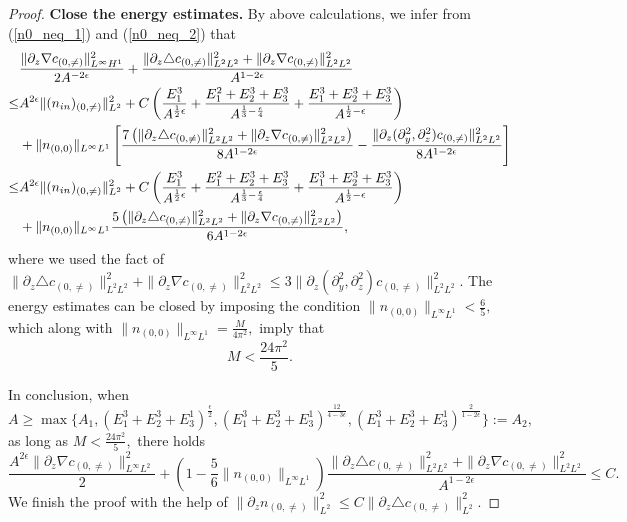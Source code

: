 \documentclass[12pt, reqno]{amsart}
\numberwithin{equation}{section}
\begin{document}
\begin{proof}
		
		{\bf  Close the energy estimates.}
		By above calculations, we infer from (\ref{n0_neq_1}) and (\ref{n0_neq_2}) that 
		\begin{equation}\label{n0_neq_3}
			\begin{aligned}
				&\frac{\|\partial_z\nabla c_{(0,\neq)}\|^2_{L^{\infty}H^1}}{2A^{-2\epsilon}}
				+\frac{\|\partial_z\triangle c_{(0,\neq)}\|^2_{L^2L^2}+
					\|\partial_z\nabla c_{(0,\neq)}\|^2_{L^{2}L^2}}{A^{1-2\epsilon}}
				\\
				\leq& A^{2\epsilon}\|(n_{\rm in})_{(0,\neq)}\|^2_{L^2}+C\left(\frac{E_1^3}{ A^{\frac{1}{2}\epsilon}}
				+\frac{E_1^2+E_2^3+E_3^3}{ A^{\frac13-\frac{\epsilon}{4}}}
				+\frac{E_1^3+E_2^3+E_3^3}{ A^{\frac12-\epsilon}}\right)\\&+\|n_{(0,0)}\|_{L^\infty L^1}
				\left[
				\frac{7\left(\|\partial_z\triangle c_{(0,\neq)}\|_{L^2L^2}^2
					+\|\partial_z\nabla c_{(0,\neq)}\|_{L^2L^2}^2\right)
				}{8A^{1-2\epsilon}}-\frac{\|\partial_{z}(\partial_{y}^{2},\partial_{z}^{2})c_{(0,\neq)}\|_{L^{2}L^{2}}^{2}}{8A^{1-2\epsilon}}\right]
				\\\leq&A^{2\epsilon}\|(n_{\rm in})_{(0,\neq)}\|^2_{L^2}+C\left(\frac{E_1^3}{ A^{\frac{1}{2}\epsilon}}
				+\frac{E_1^2+E_2^3+E_3^3}{ A^{\frac13-\frac{\epsilon}{4}}}
				+\frac{E_1^3+E_2^3+E_3^3}{ A^{\frac12-\epsilon}}\right)\\&+\|n_{(0,0)}\|_{L^{\infty}L^{1}}\frac{5\left(\|\partial_z\triangle c_{(0,\neq)}\|_{L^2L^2}^2
					+\|\partial_z\nabla c_{(0,\neq)}\|_{L^2L^2}^2\right)}{6A^{1-2\epsilon}},
			\end{aligned}
		\end{equation}
		where we used the fact of $ \|\partial_{z}\triangle c_{(0,\neq)}\|_{L^{2}L^{2}}^{2}+\|\partial_{z}\nabla c_{(0,\neq)}\|_{L^{2}L^{2}}^{2}\leq 3\|\partial_{z}(\partial_{y}^{2}, \partial_{z}^{2})c_{(0,\neq)}\|_{L^{2}L^{2}}^{2}. $
		The energy estimates can be closed by imposing the condition
		$\|n_{(0,0)}\|_{L^\infty L^1}<\frac65,$
		which along with $\|n_{(0,0)}\|_{L^{\infty}L^1}=\frac{M}{4\pi^2},$
		imply that 
		\begin{equation*}
			M<\frac{24\pi^2}{5}.
		\end{equation*}
		
		In conclusion,
		when $$A\geq\max\{A_1,(E_1^3+E_2^3+E_3^1)^{\frac{\epsilon}{2}},
		(E_1^3+E_2^3+E_3^1)^{\frac{12}{4-3\epsilon}},(E_1^3+E_2^3+E_3^1)^{\frac{2}{1-2\epsilon}}\}:=A_2,$$ as long as $M< \frac{24\pi^2}{5},$
		there holds 
		\begin{equation*}
			\frac{A^{2\epsilon}\|\partial_z\nabla c_{(0,\neq)}\|^2_{L^{\infty}L^2}}{2}+\left(1-\frac56\|n_{(0,0)}\|_{L^{\infty}L^{1}} \right)
			\frac{\|\partial_z\triangle c_{(0,\neq)}\|_{L^2L^2}^2
				+\|\partial_z\nabla c_{(0,\neq)}\|_{L^2L^2}^2}{A^{1-2\epsilon}}
			\leq C.
		\end{equation*}
		We finish the proof with the help of 
		$\|\partial_zn_{(0,\neq)}\|_{L^{2}}^{2}\leq C\|\partial_z\triangle c_{(0,\neq)}\|_{L^{2}}^{2}$.
	\end{proof}
	
\end{document}
